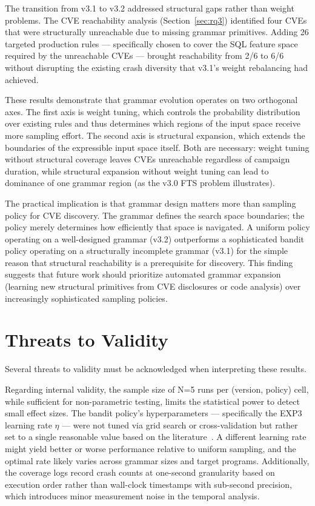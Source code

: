 The transition from v3.1 to v3.2 addressed structural gaps rather than weight problems. The CVE reachability analysis (Section~\ref{sec:rq3}) identified four CVEs that were structurally unreachable due to missing grammar primitives. Adding 26 targeted production rules --- specifically chosen to cover the SQL feature space required by the unreachable CVEs --- brought reachability from 2/6 to 6/6 without disrupting the existing crash diversity that v3.1's weight rebalancing had achieved.

These results demonstrate that grammar evolution operates on two orthogonal axes. The first axis is weight tuning, which controls the probability distribution over existing rules and thus determines which regions of the input space receive more sampling effort. The second axis is structural expansion, which extends the boundaries of the expressible input space itself. Both are necessary: weight tuning without structural coverage leaves CVEs unreachable regardless of campaign duration, while structural expansion without weight tuning can lead to dominance of one grammar region (as the v3.0 FTS problem illustrates).

The practical implication is that grammar design matters more than sampling policy for CVE discovery. The grammar defines the search space boundaries; the policy merely determines how efficiently that space is navigated. A uniform policy operating on a well-designed grammar (v3.2) outperforms a sophisticated bandit policy operating on a structurally incomplete grammar (v3.1) for the simple reason that structural reachability is a prerequisite for discovery. This finding suggests that future work should prioritize automated grammar expansion (learning new structural primitives from CVE disclosures or code analysis) over increasingly sophisticated sampling policies.


\section{Threats to Validity}
\label{sec:threats}

Several threats to validity must be acknowledged when interpreting these results.

Regarding internal validity, the sample size of N=5 runs per (version, policy) cell, while sufficient for non-parametric testing, limits the statistical power to detect small effect sizes. The bandit policy's hyperparameters --- specifically the EXP3 learning rate $\eta$ --- were not tuned via grid search or cross-validation but rather set to a single reasonable value based on the literature~\cite{exp3}. A different learning rate might yield better or worse performance relative to uniform sampling, and the optimal rate likely varies across grammar sizes and target programs. Additionally, the coverage logs record crash counts at one-second granularity based on execution order rather than wall-clock timestamps with sub-second precision, which introduces minor measurement noise in the temporal analysis.

